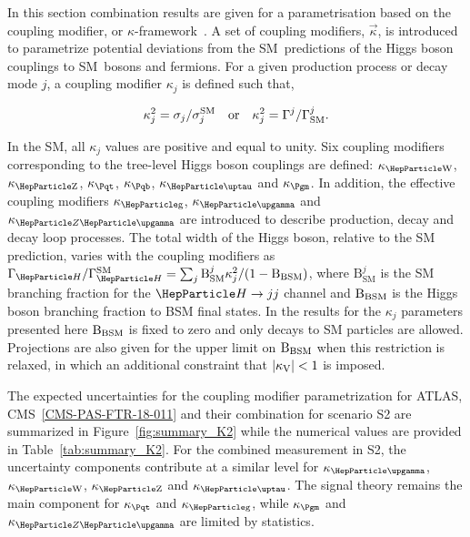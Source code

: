 
In this section combination results are given for a parametrisation based on the coupling modifier, or $\kappa$-framework~\cite{Heinemeyer:2013tqa}. A set of coupling modifiers, $\vec\kappa$, is introduced to parametrize potential deviations from the SM~predictions of the Higgs boson couplings to SM~bosons and fermions. For a given production process or decay mode $j$, a coupling modifier $\kappa_j$ is defined such that,

\begin{equation}
\label{eq:kappa}
  \kappa_j^2=\sigma_j/\sigma_j^\SM\ \ \ {\rm or}\ \ \  \kappa_j^2=\Gamma^j/\Gamma^j_\SM.
\end{equation}

In the SM, all $\kappa_j$ values are positive and equal to unity. Six coupling modifiers corresponding to the tree-level Higgs boson couplings are defined: $\kW$, $\kZ$, $\ktop$, $\kb$, $\ktau$ and $\kmu$. In addition, the effective coupling modifiers $\kglu$, $\kgam$ and $\kzgam$ are introduced to describe \ggh production, \hgg decay and \hzg decay loop processes. 
The total width of the Higgs boson, relative to the SM prediction, varies with the coupling modifiers as $\GammaSM = \sum_{j}\mathrm{B}^{j}_{\text{SM}}\kappa_{j}^{2} / (1 - \Bbsm)$, where $\mathrm{B}^{j}_{\text{SM}}$ is the SM branching fraction for the $\PH\rightarrow jj$ channel and $\mathrm{B_{BSM}}$ is the Higgs boson branching fraction to BSM final states. In the results for the $\kappa_j$ parameters presented here $\mathrm{B_{BSM}}$ is fixed to zero and only decays to SM particles are allowed. Projections are also given for the upper limit on $\mathrm{B_{BSM}}$ when this restriction is relaxed, in which an additional constraint that $|\kappa_{\mathrm{V}}| < 1$ is imposed. 

The expected uncertainties for the coupling modifier parametrization for ATLAS, CMS~\ref{CMS-PAS-FTR-18-011} and their combination for scenario S2 are summarized in Figure~\ref{fig:summary_K2} while the numerical values are provided in Table~\ref{tab:summary_K2}.
For the combined measurement in S2, the uncertainty components  contribute at a similar level for $\kgam$, $\kW$, $\kZ$ and $\ktau$. The signal theory remains the main component for $\ktop$ and $\kglu$, while $\kmu$ and $\kzgam$ are limited by statistics.

